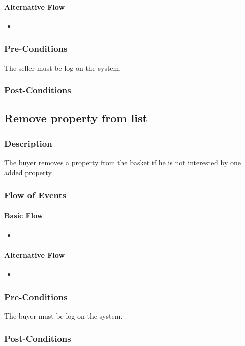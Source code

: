 \documentclass[a4paper,12pt]{article}
\begin{document}
\paragraph{Alternative Flow}
\begin{itemize}
\item
\end{itemize}
\subsubsection{Pre-Conditions}
The seller must be log on the system.
\subsubsection{Post-Conditions}

\subsection{Remove property from list}
\subsubsection{Description}
The buyer removes a property from the basket if he is not interested by one added property.
\subsubsection{Flow of Events}
\paragraph{Basic Flow}
\begin{itemize}
\item
\end{itemize}
\paragraph{Alternative Flow}
\begin{itemize}
\item
\end{itemize}
\subsubsection{Pre-Conditions}
The buyer must be log on the system.
\subsubsection{Post-Conditions}
\end{document}
